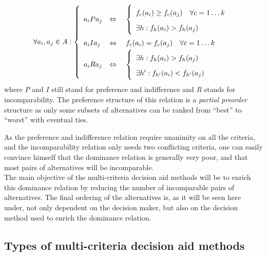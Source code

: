 \begin{equation}
  \label{eqn:IP}
  \forall a_i, a_j \in A: \left\{
    \renewcommand{\arraystretch}{1.75}
    \begin{array}{l l}
      a_iPa_j  & \Leftrightarrow \quad \left\{
          \begin{array}{l l}
              f_c(a_i)\ge f_c(a_j) \quad \forall c=1\dots k \\
              \exists h: f_h(a_i) > f_h(a_j) \\
          \end{array} \right . \\
      a_iIa_j & \Leftrightarrow \quad f_c(a_i) = f_c(a_j) \quad \forall c=1 \dots k \\
      a_iRa_j & \Leftrightarrow \quad \left\{
          \begin{array}{l l}
              \exists h: f_h(a_i) > f_h(a_j) \\
              \exists h': f_{h'}(a_i)< f_{h'}(a_j) \\
          \end{array} \right . \\
    \end{array} \right .
\end{equation}
where $P$ and $I$ still stand for preference and indifference and $R$ stands for incomparability.
The preference structure of this relation is a \textit{partial preorder} structure \cite{Vin92} as only some subsets of alternatives can be ranked from ``best'' to ``worst'' with eventual ties.

As the preference and indifference relation require unanimity on all the criteria, and the incomparability relation only needs two conflicting criteria, one can easily convince himself that the dominance relation is generally very poor, and that most pairs of alternatives will be incomparable.\\
The main objective of the multi-criteria decision aid methods will be to enrich this dominance relation by reducing the number of incomparable pairs of alternatives. The final ordering of the alternatives is, as it will be seen here under, not only dependent on the decision maker, but also on the decision method used to enrich the dominance relation.

\subsection{Types of multi-criteria decision aid methods}


